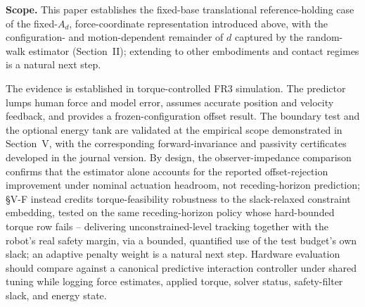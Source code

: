 \documentclass[conference]{IEEEtran}
\begin{document}
\textbf{Scope.} This paper establishes the fixed-base translational
reference-holding case of the fixed-$A_d$, force-coordinate representation
introduced above, with the configuration- and motion-dependent remainder
of $d$ captured by the random-walk estimator (Section~II); extending to
other embodiments and contact regimes is a natural next step.

The evidence is established in torque-controlled FR3 simulation. The
predictor lumps human force and model error, assumes accurate position and
velocity feedback, and provides a frozen-configuration offset result. The
boundary test and the optional energy tank are validated at the empirical
scope demonstrated in Section~V, with the corresponding forward-invariance
and passivity certificates developed in the journal version. By design,
the observer-impedance comparison confirms that the estimator alone
accounts for the reported offset-rejection improvement under nominal
actuation headroom, not receding-horizon prediction; \S V-F instead
credits torque-feasibility robustness to the slack-relaxed constraint
embedding, tested on the same receding-horizon policy whose hard-bounded
torque row fails -- delivering unconstrained-level tracking together with
the robot's real safety margin, via a bounded, quantified use of the test
budget's own slack; an adaptive penalty weight is a natural next step.
Hardware evaluation should compare against a canonical predictive
interaction controller under shared tuning while logging force estimates,
applied torque, solver status, safety-filter slack, and energy state.



\end{document}
